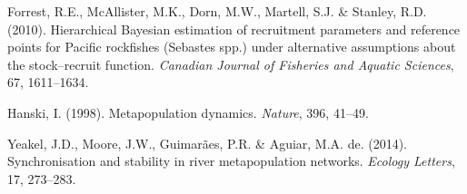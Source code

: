 \documentclass[]{article}
\begin{document}
\leavevmode\hypertarget{ref-Forrest2010}{}%
Forrest, R.E., McAllister, M.K., Dorn, M.W., Martell, S.J. \& Stanley,
R.D. (2010). Hierarchical Bayesian estimation of recruitment parameters
and reference points for Pacific rockfishes (Sebastes spp.) under
alternative assumptions about the stock--recruit function.
\emph{Canadian Journal of Fisheries and Aquatic Sciences}, 67,
1611--1634.

\leavevmode\hypertarget{ref-Hanski1998}{}%
Hanski, I. (1998). Metapopulation dynamics. \emph{Nature}, 396, 41--49.

\leavevmode\hypertarget{ref-Yeakel2014}{}%
Yeakel, J.D., Moore, J.W., Guimarães, P.R. \& Aguiar, M.A. de. (2014).
Synchronisation and stability in river metapopulation networks.
\emph{Ecology Letters}, 17, 273--283.
\end{document}
